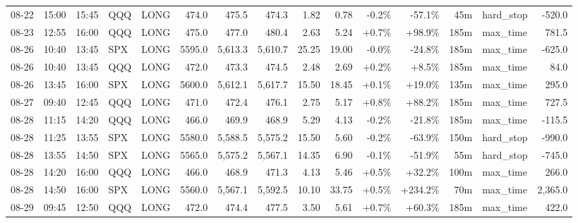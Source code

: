 \documentclass[11pt,a4paper,twoside]{article}
\begin{document}
\begin{landscape}
\begin{center}
\begin{longtable}{>{\color{txtmain}}l l l l l r r r r r r r r >{\color{txtmain}}l r}
08-22 & 15:00 & 15:45 & QQQ & LONG & 474.0 & 475.5 & 474.3 & 1.82 & 0.78 & \textcolor{lossred}{-0.2\%} & \textcolor{lossred}{-57.1\%} & 45m & hard\_stop & \textcolor{lossred}{-520.0} \\
08-23 & 12:55 & 16:00 & QQQ & LONG & 475.0 & 477.0 & 480.4 & 2.63 & 5.24 & \textcolor{wingreen}{+0.7\%} & \textcolor{wingreen}{+98.9\%} & 185m & max\_time & \textcolor{wingreen}{781.5} \\
08-26 & 10:40 & 13:45 & SPX & LONG & 5595.0 & 5,613.3 & 5,610.7 & 25.25 & 19.00 & \textcolor{lossred}{-0.0\%} & \textcolor{lossred}{-24.8\%} & 185m & max\_time & \textcolor{lossred}{-625.0} \\
08-26 & 10:40 & 13:45 & QQQ & LONG & 472.0 & 473.3 & 474.5 & 2.48 & 2.69 & \textcolor{wingreen}{+0.2\%} & \textcolor{wingreen}{+8.5\%} & 185m & max\_time & \textcolor{wingreen}{84.0} \\
08-26 & 13:45 & 16:00 & SPX & LONG & 5600.0 & 5,612.1 & 5,617.7 & 15.50 & 18.45 & \textcolor{wingreen}{+0.1\%} & \textcolor{wingreen}{+19.0\%} & 135m & max\_time & \textcolor{wingreen}{295.0} \\
08-27 & 09:40 & 12:45 & QQQ & LONG & 471.0 & 472.4 & 476.1 & 2.75 & 5.17 & \textcolor{wingreen}{+0.8\%} & \textcolor{wingreen}{+88.2\%} & 185m & max\_time & \textcolor{wingreen}{727.5} \\
08-28 & 11:15 & 14:20 & QQQ & LONG & 466.0 & 469.9 & 468.9 & 5.29 & 4.13 & \textcolor{lossred}{-0.2\%} & \textcolor{lossred}{-21.8\%} & 185m & max\_time & \textcolor{lossred}{-115.5} \\
08-28 & 11:25 & 13:55 & SPX & LONG & 5580.0 & 5,588.5 & 5,575.2 & 15.50 & 5.60 & \textcolor{lossred}{-0.2\%} & \textcolor{lossred}{-63.9\%} & 150m & hard\_stop & \textcolor{lossred}{-990.0} \\
08-28 & 13:55 & 14:50 & SPX & LONG & 5565.0 & 5,575.2 & 5,567.1 & 14.35 & 6.90 & \textcolor{lossred}{-0.1\%} & \textcolor{lossred}{-51.9\%} & 55m & hard\_stop & \textcolor{lossred}{-745.0} \\
08-28 & 14:20 & 16:00 & QQQ & LONG & 466.0 & 468.9 & 471.3 & 4.13 & 5.46 & \textcolor{wingreen}{+0.5\%} & \textcolor{wingreen}{+32.2\%} & 100m & max\_time & \textcolor{wingreen}{266.0} \\
08-28 & 14:50 & 16:00 & SPX & LONG & 5560.0 & 5,567.1 & 5,592.5 & 10.10 & 33.75 & \textcolor{wingreen}{+0.5\%} & \textcolor{wingreen}{+234.2\%} & 70m & max\_time & \textcolor{wingreen}{2,365.0} \\
08-29 & 09:45 & 12:50 & QQQ & LONG & 472.0 & 474.4 & 477.5 & 3.50 & 5.61 & \textcolor{wingreen}{+0.7\%} & \textcolor{wingreen}{+60.3\%} & 185m & max\_time & \textcolor{wingreen}{422.0} \\

\end{longtable}
\end{center}
\end{landscape}
\end{document}
